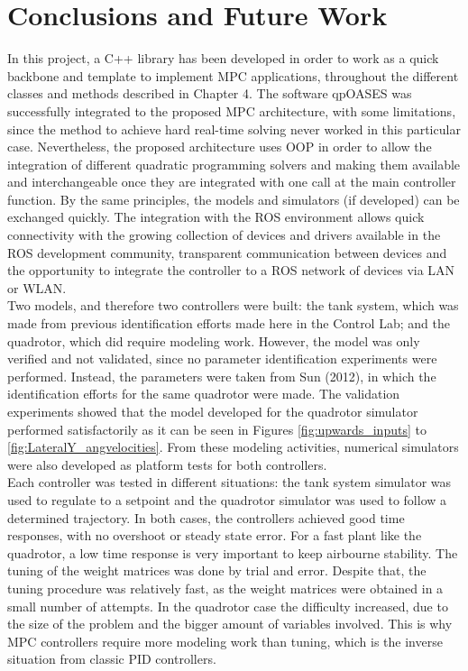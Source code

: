 \chapter{Conclusions and Future Work}
\label{chap:Conclusions_and_Future_Work}

In this project, a C++ library has been developed in order to work as a quick backbone and template to implement MPC applications, throughout  the different classes and methods described in Chapter 4. The software qpOASES was successfully integrated to the proposed MPC architecture, with some limitations, since the method to achieve hard real-time solving never worked in this particular case. Nevertheless, the proposed architecture uses OOP in order to allow the integration of different quadratic programming solvers and making them available and interchangeable once they are integrated with one call at the main controller function. By the same principles, the models and simulators (if developed) can be exchanged quickly. The integration with the ROS environment allows quick connectivity with the growing collection of devices and drivers available in the ROS development community, transparent communication between devices and the opportunity to integrate the controller to a ROS network of devices via LAN or WLAN.  \\ 

Two models, and therefore two controllers were built: the tank system, which was made from previous identification efforts made here in the Control Lab; and the quadrotor, which did require modeling work. However, the model was only verified and not validated, since no parameter identification experiments were performed. Instead, the parameters were taken from Sun \cite{YueSun2012} (2012), in which the identification efforts for the same quadrotor were made. The validation experiments showed that the model developed for the quadrotor simulator performed satisfactorily as it can be seen in Figures \ref{fig:upwards_inputs} to \ref{fig:LateralY_angvelocities}. From these modeling activities, numerical simulators were also developed as platform tests for both controllers. \\

Each controller was tested in different situations: the tank system simulator was used to regulate to a setpoint and the quadrotor simulator was used to follow a determined trajectory. In both cases, the controllers achieved good time responses, with no overshoot or steady state error. For a fast plant like the quadrotor, a low time response is very important to keep airbourne stability. The tuning of the weight matrices was done by trial and error. Despite that, the tuning procedure was relatively fast, as the weight matrices were obtained in a small number of attempts. In the quadrotor case the difficulty increased, due to the size of the problem and the bigger amount of variables involved. This is why MPC controllers require more modeling work than tuning, which is the inverse situation from classic PID controllers. \\

